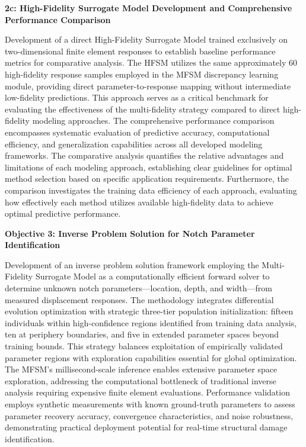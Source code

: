 \documentclass[12pt,a4paper]{report}
\begin{document}
\bigskip

\textbf{2c: High-Fidelity Surrogate Model Development and Comprehensive Performance Comparison}

\medskip

Development of a direct High-Fidelity Surrogate Model trained exclusively on two-dimensional finite element responses to establish baseline performance metrics for comparative analysis. The HFSM utilizes the same approximately 60 high-fidelity response samples employed in the MFSM discrepancy learning module, providing direct parameter-to-response mapping without intermediate low-fidelity predictions. This approach serves as a critical benchmark for evaluating the effectiveness of the multi-fidelity strategy compared to direct high-fidelity modeling approaches. The comprehensive performance comparison encompasses systematic evaluation of predictive accuracy, computational efficiency, and generalization capabilities across all developed modeling frameworks. The comparative analysis quantifies the relative advantages and limitations of each modeling approach, establishing clear guidelines for optimal method selection based on specific application requirements. Furthermore, the comparison investigates the training data efficiency of each approach, evaluating how effectively each method utilizes available high-fidelity data to achieve optimal predictive performance.

\bigskip

\textbf{Objective 3: Inverse Problem Solution for Notch Parameter Identification}

\medskip

Development of an inverse problem solution framework employing the Multi-Fidelity Surrogate Model as a computationally efficient forward solver to determine unknown notch parameters—location, depth, and width—from measured displacement responses. The methodology integrates differential evolution optimization with strategic three-tier population initialization: fifteen individuals within high-confidence regions identified from training data analysis, ten at periphery boundaries, and five in extended parameter spaces beyond training bounds. This strategy balances exploitation of empirically validated parameter regions with exploration capabilities essential for global optimization. The MFSM's millisecond-scale inference enables extensive parameter space exploration, addressing the computational bottleneck of traditional inverse analysis requiring expensive finite element evaluations. Performance validation employs synthetic measurements with known ground-truth parameters to assess parameter recovery accuracy, convergence characteristics, and noise robustness, demonstrating practical deployment potential for real-time structural damage identification.
\end{document}
